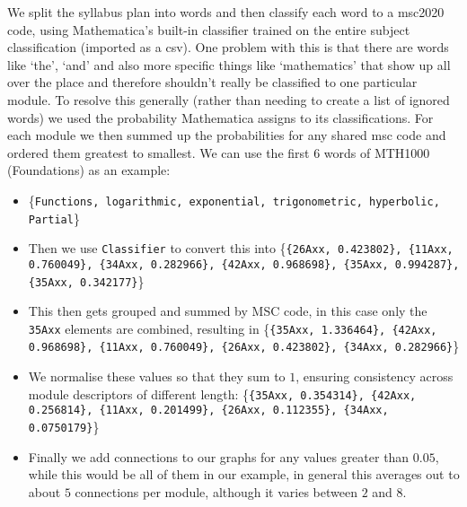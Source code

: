 \documentclass[english, 12pt]{article}
\begin{document}
We split the syllabus plan into words and then classify each word to a msc2020 code, using Mathematica's built-in classifier trained on the entire subject classification (imported as a csv). One problem with this is that there are words like `the', `and' and also more specific things like `mathematics' that show up all over the place and therefore shouldn't really be classified to one particular module. To resolve this generally (rather than needing to create a list of ignored words) we used the probability Mathematica assigns to its classifications. For each module we then summed up the probabilities for any shared msc code and ordered them greatest to smallest. We can use the first 6 words of MTH1000 (Foundations) as an example:
\begin{itemize}
	\item \{\texttt{Functions, logarithmic, exponential, trigonometric, hyperbolic, Partial}\}
	\item Then we use \texttt{Classifier} to convert this into \{\texttt{\{26Axx, 0.423802\}, \{11Axx, 0.760049\}, \{34Axx, 0.282966\}, \{42Axx, 0.968698\}, \{35Axx, 0.994287\}, \{35Axx, 0.342177\}}\}
	\item This then gets grouped and summed by MSC code, in this case only the \texttt{35Axx} elements are combined, resulting in \{\texttt{\{35Axx, 1.336464\}, \{42Axx, 0.968698\}, \{11Axx, 0.760049\}, \{26Axx, 0.423802\}, \{34Axx, 0.282966\}}\}
	\item We normalise these values so that they sum to $1$, ensuring consistency across module descriptors of different length: \{\texttt{\{35Axx, 0.354314\}, \{42Axx, 0.256814\}, \{11Axx, 0.201499\}, \{26Axx, 0.112355\}, \{34Axx, 0.0750179\}}\}
  	\item Finally we add connections to our graphs for any values greater than $0.05$, while this would be all of them in our example, in general this averages out to about $5$ connections per module, although it varies between $2$ and $8$.
\end{itemize}

\printbibliography
\end{document}
